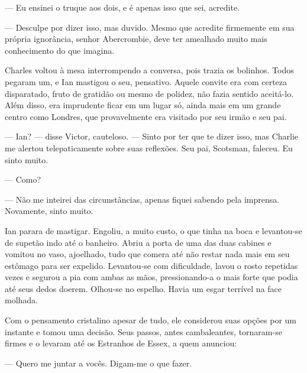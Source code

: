 --- Eu ensinei o truque aos dois, e é apenas isso que sei, acredite.

--- Desculpe por dizer isso, mas duvido. Mesmo que acredite firmemente em sua
própria ignorância, senhor Abercrombie, deve ter amealhado muito mais
conhecimento do que imagina.

Charles voltou à mesa interrompendo a conversa, pois trazia os bolinhos. Todos
pegaram um, e Ian mastigou o seu, pensativo. Aquele convite era com certeza
disparatado, fruto de gratidão ou mesmo de polidez, não fazia sentido
aceitá-lo. Além disso, era imprudente ficar em um lugar só, ainda mais em um
grande centro como Londres, que provavelmente era visitado por seu irmão e seu
pai.

--- Ian? --- disse Victor, cauteloso. --- Sinto por ter que te dizer isso, mas
Charlie me alertou telepaticamente sobre suas reflexões. Seu pai, Scotsman,
faleceu. Eu sinto muito.

--- Como?

--- Não me inteirei das circunstâncias, apenas fiquei sabendo pela imprensa.
Novamente, sinto muito.

Ian parara de mastigar. Engoliu, a muito custo, o que tinha na boca e
levantou-se de supetão indo até o banheiro. Abriu a porta de uma das duas
cabines e vomitou no vaso, ajoelhado, tudo que comera até não restar nada mais
em seu estômago para ser expelido. Levantou-se com dificuldade, lavou o rosto
repetidas vezes e segurou a pia com ambas as mãos, pressionando-a o mais forte
que podia até seus dedos doerem. Olhou-se no espelho. Havia um esgar terrível
na face molhada.

Com o pensamento cristalino apesar de tudo, ele considerou suas opções por um
instante e tomou uma decisão. Seus passos, antes cambaleantes, tornaram-se
firmes e o levaram até os Estranhos de Essex, a quem anunciou:

--- Quero me juntar a vocês. Digam-me o que fazer.
